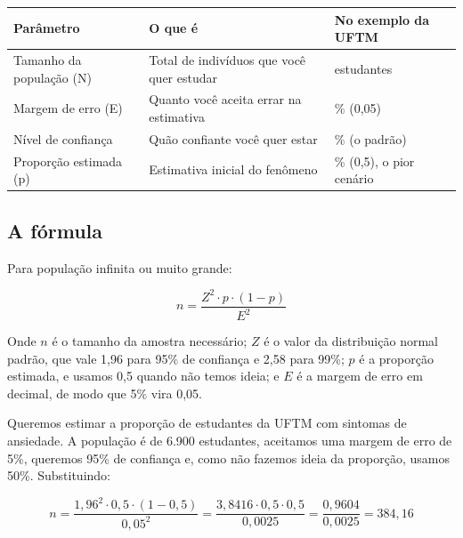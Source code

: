 \documentclass[
]{book}
\newcounter{none} %
\begin{document}
{\def\LTcaptype{none} %
\begin{longtable}[]{@{}
  >{\raggedright\arraybackslash}p{}
  >{\raggedright\arraybackslash}p{}
  >{\raggedright\arraybackslash}p{}@{}}
\toprule\noalign{}
\begin{minipage}[b]{\linewidth}\raggedright
Parâmetro
\end{minipage} & \begin{minipage}[b]{\linewidth}\raggedright
O que é
\end{minipage} & \begin{minipage}[b]{\linewidth}\raggedright
No exemplo da UFTM
\end{minipage} \\
\midrule\noalign{}
\endhead
\bottomrule\noalign{}
\endlastfoot
Tamanho da população (N) & Total de indivíduos que você quer estudar & 6.900 estudantes \\
Margem de erro (E) & Quanto você aceita errar na estimativa & 5\% (0,05) \\
Nível de confiança & Quão confiante você quer estar & 95\% (o padrão) \\
Proporção estimada (p) & Estimativa inicial do fenômeno & 50\% (0,5), o pior cenário \\
\end{longtable}
}

\subsection{A fórmula}\label{a-fuxf3rmula}

Para população infinita ou muito grande:

\[
n = \frac{Z^2 \cdot p \cdot (1 - p)}{E^2}
\]

Onde \(n\) é o tamanho da amostra necessário; \(Z\) é o valor da distribuição normal padrão, que vale 1,96 para 95\% de confiança e 2,58 para 99\%; \(p\) é a proporção estimada, e usamos 0,5 quando não temos ideia; e \(E\) é a margem de erro em decimal, de modo que 5\% vira 0,05.

Queremos estimar a proporção de estudantes da UFTM com sintomas de ansiedade. A população é de 6.900 estudantes, aceitamos uma margem de erro de 5\%, queremos 95\% de confiança e, como não fazemos ideia da proporção, usamos 50\%. Substituindo:

\[
n = \frac{1,96^2 \cdot 0,5 \cdot (1 - 0,5)}{0,05^2} = \frac{3,8416 \cdot 0,5 \cdot 0,5}{0,0025} = \frac{0,9604}{0,0025} = 384,16
\]
\end{document}
